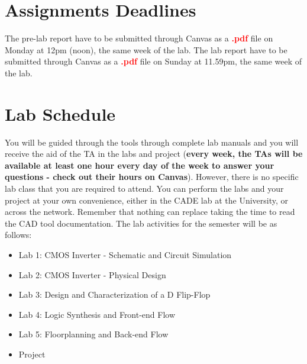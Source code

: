 \newcommand{\labtitle}{ECE/CS 5710/6710 - Lab Introduction}
\newcommand{\labsubtitle}{Introductions to the Labs}
\vlsiheader

\section{Assignments Deadlines}
The pre-lab report have to be submitted through Canvas as a \textcolor{red}{\textbf{.pdf}} file on Monday at 12pm (noon), the same week of the lab. \newline
The lab report have to be submitted through Canvas as a \textcolor{red}{\textbf{.pdf}} file on Sunday at 11.59pm, the same week of the lab.

\section{Lab Schedule}
You will be guided through the tools through complete lab manuals and you will receive the aid of the TA in the labs and project (\textbf{every week, the TAs will be available at least one hour every day of the week to answer your questions - check out their hours on Canvas}). However, there is no specific lab class that you are required to attend. You can perform the labs and your project at your own convenience, either in the CADE lab at the University, or across the network. Remember that nothing can replace taking the time to read the CAD tool documentation. The lab activities for the semester will be as follows: 
	\begin{itemize}	
	\item Lab 1: CMOS Inverter - Schematic and Circuit Simulation
	\item Lab 2: CMOS Inverter - Physical Design
	\item Lab 3: Design and Characterization of a D Flip-Flop
	\item Lab 4: Logic Synthesis and Front-end Flow
	\item Lab 5: Floorplanning and Back-end Flow
	\item Project
	\end{itemize} 	

